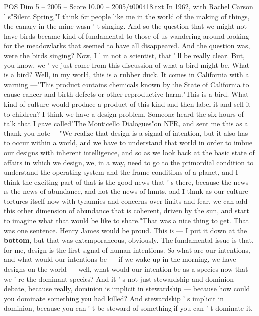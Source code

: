 \begin{textsample}{POS Dim 5 – 2005 – Score 10.00 – 2005/t000418.txt}  \label{ex:f5_pos_008}
In 1962, with Rachel Carson ' s"Silent Spring,"I think for people like me in the world of the making of things, the canary in the mine wasn ' t singing.
And so the question that we might not have birds became kind of fundamental to those of us wandering around looking for the meadowlarks that seemed to have all disappeared.
And the question was, were the birds singing?
Now, I ' m not a scientist, that ' ll be really clear.
But, you know, we ' ve just come from this discussion of what a bird might be.
What is a bird?
Well, in my world, this is a rubber duck.
It comes in California with a warning —"This product contains chemicals known by the State of California to cause cancer and birth defects or other reproductive harm."This is a bird.
What kind of culture would produce a product of this kind and then label it and sell it to children?
I think we have a design problem.
Someone heard the six hours of talk that I gave called"The Monticello Dialogues"on NPR, and sent me this as a thank you note —"We realize that design is a signal of intention, but it also has to occur within a world, and we have to understand that world in order to imbue our designs with inherent intelligence, and so as we look back at the basic state of affairs in which we design, we, in a way, need to go to the primordial condition to understand the operating system and the frame conditions of a planet, and I think the exciting part of that is the good news that ' s there, because the news is the news of abundance, and not the news of limits, and I think as our culture tortures itself now with tyrannies and concerns over limits and fear, we can add this other dimension of abundance that is coherent, driven by the sun, and start to imagine what that would be like to share."That was a nice thing to get.
That was one sentence.
Henry James would be proud.
This is — I put it down at the \textbf{bottom}, but that was extemporaneous, obviously.
The fundamental issue is that, for me, design is the first signal of human intentions.
So what are our intentions, and what would our intentions be — if we wake up in the morning, we have designs on the world — well, what would our intention be as a species now that we ' re the dominant species?
And it ' s not just stewardship and dominion debate, because really, dominion is implicit in stewardship — because how could you dominate something you had killed?
And stewardship ' s implicit in dominion, because you can ' t be steward of something if you can ' t dominate it.

\end{textsample}
